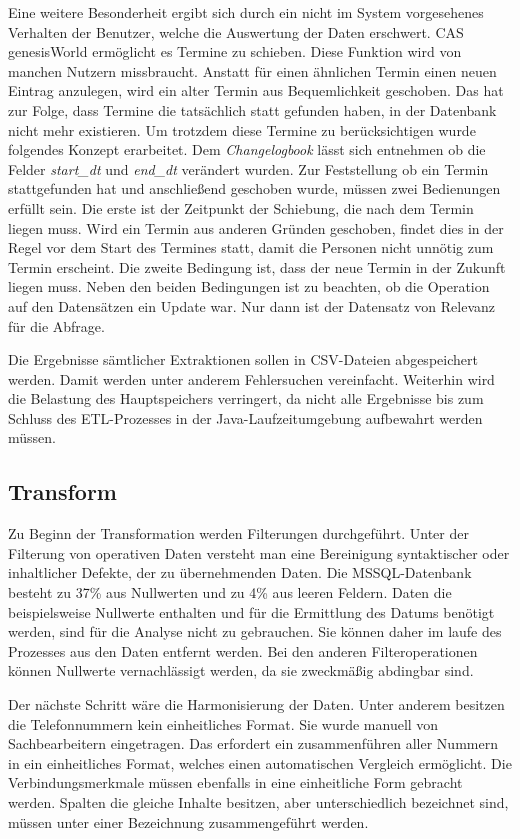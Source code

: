 Eine weitere Besonderheit ergibt sich durch ein nicht im System vorgesehenes Verhalten der Benutzer, welche die Auswertung der Daten erschwert. CAS genesisWorld ermöglicht es Termine zu schieben. Diese Funktion wird von manchen Nutzern missbraucht. Anstatt für einen ähnlichen Termin einen neuen Eintrag anzulegen, wird ein alter Termin aus Bequemlichkeit geschoben. Das hat zur Folge, dass Termine die tatsächlich statt gefunden haben, in der Datenbank nicht mehr existieren. Um trotzdem diese Termine zu berücksichtigen wurde folgendes Konzept erarbeitet. Dem \textit{Changelogbook} lässt sich entnehmen ob die Felder \textit{start\_dt} und \textit{end\_dt} verändert wurden. Zur Feststellung ob ein Termin stattgefunden hat und anschließend geschoben wurde, müssen zwei Bedienungen erfüllt sein. 
Die erste ist der Zeitpunkt der Schiebung, die nach dem Termin liegen muss. Wird ein Termin aus anderen Gründen geschoben, findet dies in der Regel vor dem Start des Termines statt, damit die Personen nicht unnötig zum Termin erscheint. Die zweite Bedingung ist, dass der neue Termin in der Zukunft liegen muss. Neben den beiden Bedingungen ist zu beachten, ob die Operation auf den Datensätzen ein Update war. Nur dann ist der Datensatz von Relevanz für die Abfrage. 

Die Ergebnisse sämtlicher Extraktionen sollen in CSV-Dateien abgespeichert werden. Damit werden unter anderem Fehlersuchen vereinfacht. Weiterhin wird die Belastung des Hauptspeichers verringert, da nicht alle Ergebnisse bis zum Schluss des ETL-Prozesses in der Java-Laufzeitumgebung aufbewahrt werden müssen.

\subsection{Transform}

Zu Beginn der Transformation werden Filterungen durchgeführt. Unter der Filterung von operativen Daten versteht man eine Bereinigung syntaktischer oder inhaltlicher Defekte, der zu übernehmenden Daten. Die MSSQL-Datenbank besteht zu 37\% aus Nullwerten und zu 4\% aus leeren Feldern. Daten die beispielsweise Nullwerte enthalten und für die Ermittlung des Datums benötigt werden, sind für die Analyse nicht zu gebrauchen. Sie können daher im laufe des Prozesses aus den Daten entfernt werden. Bei den anderen Filteroperationen können Nullwerte vernachlässigt werden, da sie zweckmäßig abdingbar sind.

Der nächste Schritt wäre die Harmonisierung der Daten. Unter anderem besitzen die Telefonnummern kein einheitliches Format. Sie wurde manuell von Sachbearbeitern eingetragen. Das erfordert ein zusammenführen aller Nummern in ein einheitliches Format, welches einen automatischen Vergleich ermöglicht. Die Verbindungsmerkmale müssen ebenfalls in eine einheitliche Form gebracht werden. Spalten die gleiche Inhalte besitzen, aber unterschiedlich bezeichnet sind, müssen unter einer Bezeichnung zusammengeführt werden. 

